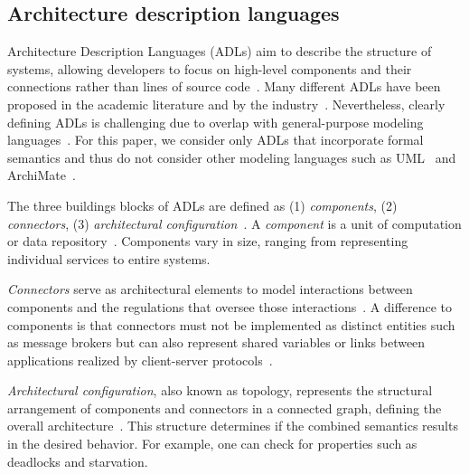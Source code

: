\documentclass[runningheads]{llncs}
\begin{document}
\subsection{Architecture description languages} \label{subsec: adl}
Architecture Description Languages (ADLs) aim to describe the structure of systems, allowing developers to focus on high-level components and their connections rather than lines of source code~\cite{clementsSurveyArchitectureDescription1996,medvidovicClassificationComparisonFramework2000,medvidovicFrameworkClassifyingComparing1997}.
Many different ADLs have been proposed in the academic literature and by the industry~\cite{medvidovicClassificationComparisonFramework2000,woodsArchitectureDescriptionLanguages2005}.
Nevertheless, clearly defining ADLs is challenging due to overlap with general-purpose modeling languages~\cite{clementsSurveyArchitectureDescription1996}.
For this paper, we consider only ADLs that incorporate formal semantics and thus do not consider other modeling languages such as UML~\cite{objectmanagementgroupUnifiedModelingLanguage2017} and ArchiMate~\cite{theopengroupArchiMateSpecification2023}.

The three buildings blocks of ADLs are defined as (1) \textit{components}, (2) \textit{connectors}, (3) \textit{architectural configuration}~\cite{medvidovicClassificationComparisonFramework2000,medvidovicFrameworkClassifyingComparing1997}.
A \textit{component} is a unit of computation or data repository~\cite{medvidovicClassificationComparisonFramework2000}.
Components vary in size, ranging from representing individual services to entire systems.

\textit{Connectors} serve as architectural elements to model interactions between components and the regulations that oversee those interactions~\cite{medvidovicClassificationComparisonFramework2000}.
A difference to components is that connectors must not be implemented as distinct entities such as message brokers but can also represent shared variables or links between applications realized by client-server protocols~\cite{medvidovicClassificationComparisonFramework2000}.

\textit{Architectural configuration}, also known as topology, represents the structural arrangement of components and connectors in a connected graph, defining the overall architecture~\cite{medvidovicClassificationComparisonFramework2000}.
This structure determines if the combined semantics results in the desired behavior.
For example, one can check for properties such as deadlocks and starvation.
\end{document}
